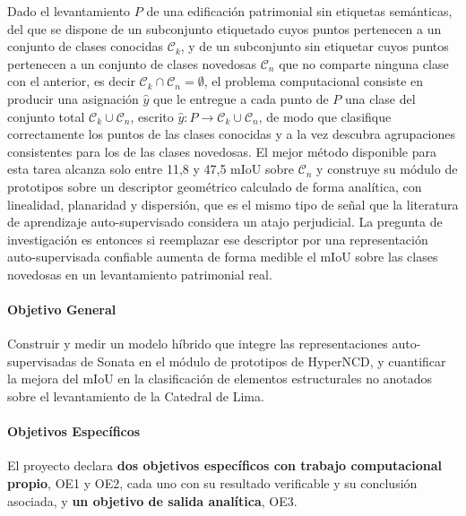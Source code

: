 Dado el levantamiento $P$ de una edificación patrimonial sin etiquetas
semánticas, del que se dispone de un subconjunto etiquetado cuyos puntos
pertenecen a un conjunto de clases conocidas $\mathcal{C}_k$, y de un subconjunto
sin etiquetar cuyos puntos pertenecen a un conjunto de clases novedosas
$\mathcal{C}_n$ que no comparte ninguna clase con el anterior, es decir
$\mathcal{C}_k\cap\mathcal{C}_n=\emptyset$, el problema computacional consiste en
producir una asignación $\hat{y}$ que le entregue a cada punto de $P$ una clase
del conjunto total $\mathcal{C}_k\cup\mathcal{C}_n$, escrito
$\hat{y}:P\rightarrow\mathcal{C}_k\cup\mathcal{C}_n$, de modo que clasifique
correctamente los puntos de las clases conocidas y a la vez descubra
agrupaciones consistentes para los de las clases novedosas. El mejor método
disponible para esta tarea alcanza solo entre 11,8 y 47,5 mIoU sobre $\mathcal{C}_n$ y construye su módulo de prototipos
sobre un descriptor geométrico calculado de forma analítica, con linealidad,
planaridad y dispersión, que es el mismo tipo de señal que la literatura de
aprendizaje auto-supervisado considera un atajo perjudicial. La pregunta de
investigación es entonces si reemplazar ese descriptor por una representación
auto-supervisada confiable aumenta de forma medible el mIoU sobre las clases
novedosas en un levantamiento patrimonial real.


\paragraph*{Objetivo General}

Construir y medir un modelo híbrido que integre las representaciones
auto-supervisadas de Sonata en el módulo de prototipos de HyperNCD, y cuantificar
la mejora del mIoU en la clasificación de elementos estructurales no anotados
sobre el levantamiento de la Catedral de Lima.

\paragraph*{Objetivos Específicos}

El proyecto declara \textbf{dos objetivos específicos con trabajo computacional
propio}, OE1 y OE2, cada uno con su resultado verificable y su conclusión
asociada, y \textbf{un objetivo de salida analítica}, OE3.

